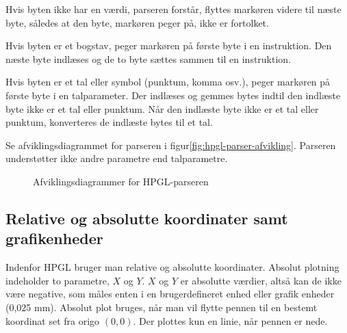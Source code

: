 Hvis byten ikke har en værdi, parseren forstår, flyttes markøren
videre til næste byte, således at den byte, markøren peger på, ikke er
fortolket.

Hvis byten er et bogstav, peger markøren på første byte i en
instruktion. Den næste byte indlæses og de to byte sættes sammen til
en instruktion.

Hvis byten er et tal eller symbol (punktum, komma osv.), peger
markøren på første byte i en talparameter. Der indlæses og gemmes
bytes indtil den indlæste byte ikke er et tal eller punktum. Når den
indlæste byte ikke er et tal eller punktum, konverteres de indlæste
bytes til et tal.

Se afviklingsdiagrammet for parseren i
figur\vref{fig:hpgl-parser-afvikling}. Parseren understøtter ikke
andre parametre end talparametre.

\begin{figure}[htbp]
  \centering
  \qquad
  \caption{Afviklingsdiagrammer for HPGL-parseren}
  \label{fig:hpgl-parser-afvikling}
\end{figure}


\subsection{Relative og absolutte koordinater samt grafikenheder}
\label{sc:relativ-absolut}

Indenfor HPGL bruger man relative og absolutte koordinater. Absolut
plotning indeholder to parametre, $X$ og $Y$. $X$ og $Y$ er absolutte
værdier, altså kan de ikke være negative, som måles enten i en
brugerdefineret enhed eller grafik enheder (0,025 mm). Absolut plot
bruges, når man vil flytte pennen til en bestemt koordinat set fra
origo $(0, 0)$. Der plottes kun en linie, når pennen er nede.


